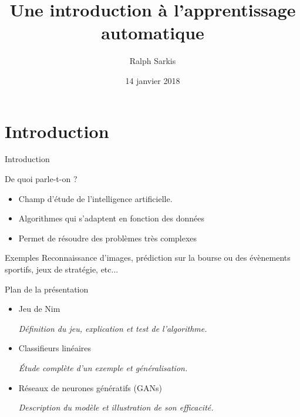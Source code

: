 \documentclass[serif]{beamer} %
\title[Apprentissage Automatique]{Une introduction à l'apprentissage automatique}
\author{Ralph Sarkis}
\institute{SUMM - 2018}
\date{14 janvier 2018}
\theoremstyle{definition}
\theoremstyle{remark}
\begin{document}
	
	\begin{frame}
	\titlepage
\end{frame}


\section{Introduction}

\begin{frame}{Introduction}
\begin{block}{De quoi parle-t-on ?}
	\pause
	\begin{itemize}
		\item Champ d'étude de l'intelligence artificielle.
		\item Algorithmes qui s'adaptent en fonction des données
		\item Permet de résoudre des problèmes très complexes
	\end{itemize}
\end{block}
\pause
\begin{block}{Exemples}
	Reconnaissance d'images, prédiction sur la bourse ou des évènements sportifs, jeux de stratégie, etc...
\end{block}

\end{frame}

\begin{frame}{Plan de la présentation}
	\begin{itemize}
		\pause
		\item Jeu de Nim
		
		\small{\textit{Définition du jeu, explication et test de l'algorithme.}}
		\vskip 0.5cm
		\pause
		\item Classifieurs linéaires
		
		\small{\textit{Étude complète d'un exemple et généralisation.}}
		\vskip 0.5cm
		\pause
		\item Réseaux de neurones génératifs (GANs)
		
		\small{\textit{Description du modèle et illustration de son efficacité.}}
	\end{itemize}
\end{frame}
\end{document}
